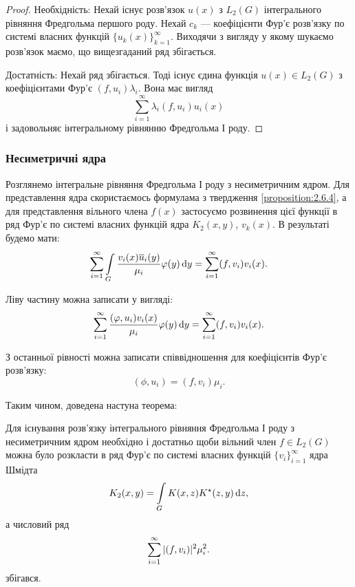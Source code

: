 \begin{proof}
	Необхідність: Нехай існує розв'язок $u(x)$ з $L_2(G)$ інтегрального рівняння Фредгольма першого роду. Нехай $c_k$ --- коефіцієнти Фур'є розв'язку по системі власних функцій $\{u_k(x)\}_{k=1}^\infty$. Виходячи з вигляду у якому шукаємо розв'язок маємо, що вищезгаданий ряд збігається. \medskip

	Достатність: Нехай ряд збігається. Тоді існує єдина функція $u(x) \in L_2(G)$ з коефіцієнтами Фур'є $(f,u_i)\lambda_i$. Вона має вигляд
	\begin{equation}
		\sum_{i=1}^\infty \lambda_i(f,u_i)u_i(x)
	\end{equation}
	і задовольняє інтегральному рівнянню Фредгольма І роду.
\end{proof}

\subsubsection{Несиметричні ядра}

Розглянемо інтегральне рівняння Фредгольма І роду з несиметричним ядром. Для представлення ядра скористаємось формулама з твердження \ref{proposition:2.6.4}, а для представлення вільного члена $f(x)$ застосуємо розвинення цієї функції в ряд Фур'є по системі власних функцій ядра $K_2(x,y)$, $v_k(x)$. В результаті будемо мати:
\begin{equation}
	\displaystyle\sum\limits_{i=1}^\infty \displaystyle\int\limits_G \dfrac{v_i(x)\overline u_i(y)}{\mu_i} \varphi(y) \mathop{}\!\mathrm{d} y = \displaystyle\sum\limits_{i=1}^\infty (f,v_i)v_i(x).
\end{equation}

Ліву частину можна записати у вигляді:
\begin{equation}
	\displaystyle\sum\limits_{i=1}^\infty \dfrac{(\varphi,u_i)v_i(x)}{\mu_i} \varphi(y) \mathop{}\!\mathrm{d} y = \displaystyle\sum\limits_{i=1}^\infty (f,v_i)v_i(x).
\end{equation}

З останньої рівності можна записати співвідношення для коефіцієнтів Фур'є розв'язку: 
\begin{equation}
	(\phi,u_i)=(f,v_i)\mu_i.
\end{equation}

Таким чином, доведена настуна теорема:
\begin{theorem}
	Для існування розв'язку інтегрального рівняння Фредгольма І роду з несиметричним ядром необхідно і достатньо щоби вільний член $f\in L_2(G)$ можна було розкласти в ряд Фур'є по системі власних функцій $\{v_i\}_{i=1}^\infty$ ядра Шмідта
	\begin{equation}
		K_2(x,y)=\displaystyle\int\limits_G K(x,z)K^\star (z,y)\mathop{}\!\mathrm{d} z,
	\end{equation}
	а числовий ряд
	\begin{equation}
		\displaystyle\sum\limits_{i=1}^\infty |(f,v_i)|^2 \mu_i^2.
	\end{equation}
	збігався.
\end{theorem}

